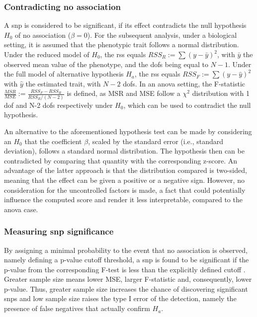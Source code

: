 \subsubsection{Contradicting no association}
A \ac{snp} is considered to be significant, if its effect contradicts the null hypothesis $H_0$ of no association ($\beta=0$). For the subsequent analysis, under a biological setting, it is assumed that the phenotypic trait follows a normal distribution. Under the reduced model of $H_0$, the \ac{rss} equals $RSS_R:=\sum{(y-\bar{y})^2}$, with $\bar{y}$ the observed mean value of the phenotype, and the \acp{dof} being equal to $N-1$. Under the full model of alternative hypothesis $H_a$, the \ac{rss} equals $RSS_F:=\sum{(y-\hat{y})^2}$ with $\hat{y}$ the estimated trait, with $N-2$ \acp{dof}. In an \ac{anova} setting, the F-statistic $\frac{MSR}{MSE}:=\frac{RSS_F-RSS_R}{RSS_R/(N-2)}$ is defined, as MSR and MSE follow a $\chi^2$ distribution with 1 \ac{dof} and N-2 \acp{dof} respectively under $H_0$, which can be used to contradict the null hypothesis. 

An alternative to the aforementioned hypothesis test can be made by considering an $H_0$ that the coefficient $\beta$,  scaled by the standard error (i.e., standard deviation), follows a standard normal distribution. The hypothesis then can be contradicted by comparing that quantity with the corresponding z-score. An advantage of the latter approach is that the distribution compared is two-sided, meaning that the effect can be given a positive or a negative sign. However, no consideration for the uncontrolled factors is made, a fact that could potentially influence the computed score and render it less interpretable, compared to the \ac{anova} case.

\subsubsection{Measuring \ac{snp} significance}

By assigning a minimal probability to the event that no association is observed, namely defining a p-value cutoff threshold, a \ac{snp} is found to be significant if the p-value from the corresponding F-test is less than the explicitly defined cutoff \cite{AlejandroGonzalez-Chica2015}. Greater sample size means lower MSE, larger F-statistic and, consequently, lower p-value. Thus, greater sample size increases the chance of discovering significant \acp{snp} and low sample size raises the type I error of the detection, namely the presence of false negatives that actually confirm $H_a$.

